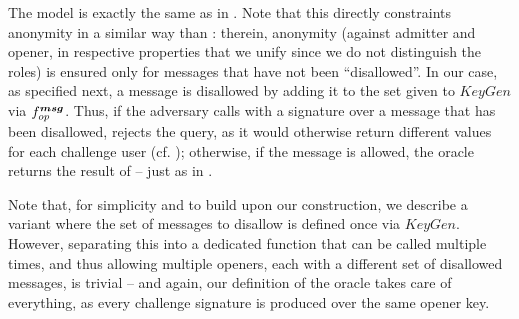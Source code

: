 The model is exactly the same as in
. Note that this directly constraints anonymity in a
similar way than \cite{ehk+19}: therein, anonymity (against admitter and opener,
in respective properties that we unify since we do not distinguish the roles) is
ensured only for messages that have not been ``disallowed''. In our case, as
specified next, a message is disallowed by adding it to the \smsg set given to
$KeyGen$ via $f_{op}^{\boldsymbol{msg}}$. Thus, if the adversary calls  with a
signature over a message that has been disallowed,  rejects the
query, as it would otherwise return different values for each challenge user
(cf. ); otherwise, if the message is allowed, the oracle
returns the result of \Open -- just as in \cite{ehk+19}.

Note that, for simplicity and to build upon our \CUASGS construction, we
describe a variant where the set of messages to disallow is defined once via
$KeyGen$. However, separating this into a dedicated \OKeyGen function that can
be called multiple times, and thus allowing multiple openers, each with a
different set of disallowed messages, is trivial -- and again, our definition
of the  oracle takes care of everything, as every challenge
signature is produced over the same opener key.

      
      
